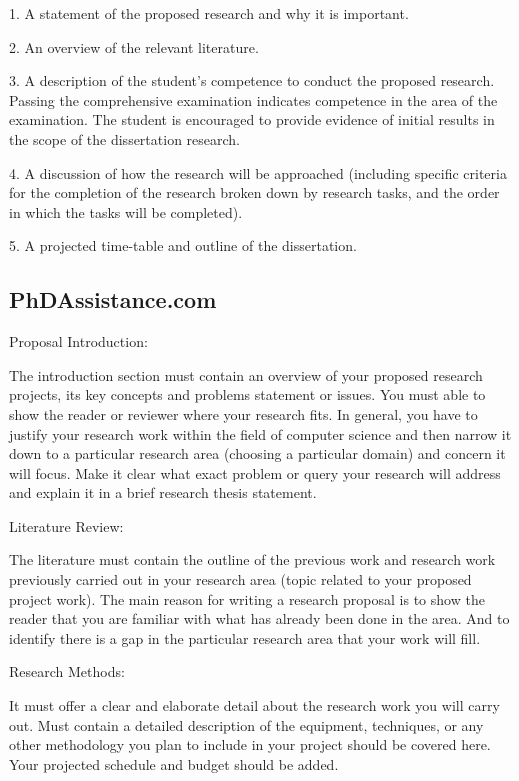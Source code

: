 1. A statement of the proposed research and why it is important.

2. An overview of the relevant literature.

3. A description of the student’s competence to conduct the proposed research. Passing the
comprehensive examination indicates competence in the area of the examination. The student
is encouraged to provide evidence of initial results in the scope of the dissertation research.

4. A discussion of how the research will be approached (including specific criteria for the
completion of the research broken down by research tasks, and the order in which the tasks will
be completed).

5. A projected time-table and outline of the dissertation.

\subsection{PhDAssistance.com}

Proposal Introduction:

The introduction section must contain an overview of your proposed research projects, its key concepts and problems statement or issues. You must able to show the reader or reviewer where your research fits. In general, you have to justify your research work within the field of computer science and then narrow it down to a particular research area (choosing a particular domain) and concern it will focus. Make it clear what exact problem or query your research will address and explain it in a brief research thesis statement.

Literature Review:

The literature must contain the outline of the previous work and research work previously carried out in your research area (topic related to your proposed project work). The main reason for writing a research proposal is to show the reader that you are familiar with what has already been done in the area. And to identify there is a gap in the particular research area that your work will fill.

Research Methods:

It must offer a clear and elaborate detail about the research work you will carry out. Must contain a detailed description of the equipment, techniques, or any other methodology you plan to include in your project should be covered here. Your projected schedule and budget should be added.

